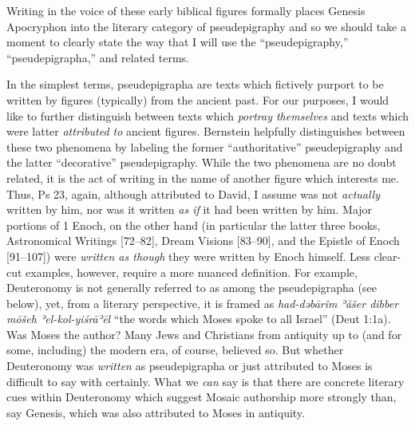Writing in the voice of these early biblical figures formally places
Genesis Apocryphon into the literary category of pseudepigraphy and so
we should take a moment to clearly state the way that I will use the
``pseudepigraphy,'' ``pseudepigrapha,'' and related terms.\autocites[The
topic of pseudepigraphy has received a large amount of very
sophisticated attention in recent years. See
especially][]{mroczek2016}{tigchelaar_tigchelaar2014}{reed_towsend-moulie2011}{reed_jts2009}{reed_ditomasso-turcescu2008}{najman_hilhorst-puech2007}{najman2003}

In the simplest terms, pseudepigrapha are texts which fictively purport
to be written by figures (typically) from the ancient past. For our
purposes, I would like to further distinguish between texts which
\emph{portray themselves} and texts which were latter \emph{attributed
to} ancient figures. Bernstein helpfully distinguishes between these two
phenomena by labeling the former ``authoritative'' pseudepigraphy and
the latter ``decorative'' pseudepigraphy.\autocite[He also identifies a
third form, ``convenient'' pseudepigraphy which is located somewhere
between the two. I do not find this category as
helpful.][3--7]{bernstein_chazon-etal1999} While the two phenomena are
no doubt related, it is the act of writing in the name of another figure
which interests me. Thus, Ps 23, again, although attributed to David, I
assume was not \emph{actually} written by him, nor was it written
\emph{as if} it had been written by him. Major portions of 1 Enoch, on
the other hand (in particular the latter three books, Astronomical
Writings {[}72--82{]}, Dream Visions {[}83--90{]}, and the Epistle of
Enoch {[}91--107{]}) were \emph{written as though} they were written by
Enoch himself. Less clear-cut examples, however, require a more nuanced
definition. For example, Deuteronomy is not generally referred to as
among the pseudepigrapha (see below), yet, from a literary perspective,
it is framed as \emph{had-dəbārîm ʾăšer dibber mōšeh ʾel-kol-yiśrāʾēl}
``the words which Moses spoke to all Israel'' (Deut 1:1a). Was Moses the
author? Many Jews and Christians from antiquity up to (and for some,
including) the modern era, of course, believed so. But whether
Deuteronomy was \emph{written} as pseudepigrapha or just attributed to
Moses is difficult to say with certainly. What we \emph{can} say is that
there are concrete literary cues within Deuteronomy which suggest Mosaic
authorship more strongly than, say Genesis, which was also attributed to
Moses in antiquity.

